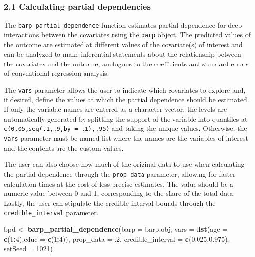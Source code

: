 \documentclass[]{article}
\newenvironment{Shaded}{\begin{snugshade}}{\end{snugshade}}
\newcommand{\KeywordTok}[1]{\textcolor[rgb]{0.13,0.29,0.53}{\textbf{#1}}}
\newcommand{\DataTypeTok}[1]{\textcolor[rgb]{0.13,0.29,0.53}{#1}}
\newcommand{\DecValTok}[1]{\textcolor[rgb]{0.00,0.00,0.81}{#1}}
\newcommand{\FloatTok}[1]{\textcolor[rgb]{0.00,0.00,0.81}{#1}}
\newcommand{\StringTok}[1]{\textcolor[rgb]{0.31,0.60,0.02}{#1}}
\newcommand{\OperatorTok}[1]{\textcolor[rgb]{0.81,0.36,0.00}{\textbf{#1}}}
\newcommand{\NormalTok}[1]{#1}
\begin{document}
\subsubsection{2.1 Calculating partial
dependencies}\label{calculating-partial-dependencies}

The \texttt{barp\_partial\_dependence} function estimates partial
dependence for deep interactions between the covariates using the
\texttt{barp} object. The predicted values of the outcome are estimated
at different values of the covariate(s) of interest and can be analyzed
to make inferential statements about the relationship between the
covariates and the outcome, analogous to the coefficients and standard
errors of conventional regression analysis.

The \texttt{vars} parameter allows the user to indicate which covariates
to explore and, if desired, define the values at which the partial
dependence should be estimated. If only the variable names are entered
as a character vector, the levels are automatically generated by
splitting the support of the variable into quantiles at
\texttt{c(0.05,seq(.1,.9,by\ =\ .1),.95)} and taking the unique values.
Otherwise, the \texttt{vars} parameter must be named list where the
names are the variables of interest and the contents are the custom
values.

The user can also choose how much of the original data to use when
calculating the partial dependence through the \texttt{prop\_data}
parameter, allowing for faster calculation times at the cost of less
precise estimates. The value should be a numeric value between 0 and 1,
corresponding to the share of the total data. Lastly, the user can
stipulate the credible interval bounds through the
\texttt{credible\_interval} parameter.

\begin{Shaded}
\begin{Highlighting}[]
\NormalTok{bpd <-}\StringTok{ }\KeywordTok{barp_partial_dependence}\NormalTok{(}\DataTypeTok{barp =}\NormalTok{ barp.obj,}
                               \DataTypeTok{vars =} \KeywordTok{list}\NormalTok{(}\DataTypeTok{age =} \KeywordTok{c}\NormalTok{(}\DecValTok{1}\OperatorTok{:}\DecValTok{4}\NormalTok{),}\DataTypeTok{educ =} \KeywordTok{c}\NormalTok{(}\DecValTok{1}\OperatorTok{:}\DecValTok{4}\NormalTok{)),}
                               \DataTypeTok{prop_data =}\NormalTok{ .}\DecValTok{2}\NormalTok{,}
                               \DataTypeTok{credible_interval =} \KeywordTok{c}\NormalTok{(}\FloatTok{0.025}\NormalTok{,}\FloatTok{0.975}\NormalTok{),}
                               \DataTypeTok{setSeed =} \DecValTok{1021}\NormalTok{)}
\end{Highlighting}
\end{Shaded}
\end{document}
